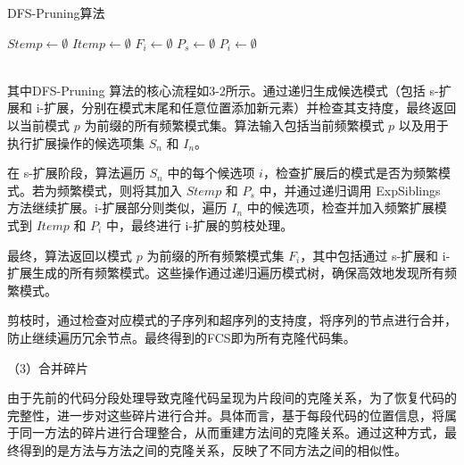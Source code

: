\begin{algorithm}[htbp]
\caption{DFS-Pruning算法}

$Stemp \gets \emptyset$ 
$Itemp \gets \emptyset$ 
$F_i \gets \emptyset$ 
$P_s \gets \emptyset$ 
$P_i \gets \emptyset$ \\
 \\
\end{algorithm}
    

其中DFS-Pruning 算法的核心流程如3-2所示。通过递归生成候选模式（包括 s-扩展和 i-扩展，分别在模式末尾和任意位置添加新元素）并检查其支持度，最终返回以当前模式 $p$ 为前缀的所有频繁模式集。算法输入包括当前频繁模式 $p$ 以及用于执行扩展操作的候选项集 $S_n$ 和 $I_n$。

在 s-扩展阶段，算法遍历 $S_n$ 中的每个候选项 $i$，检查扩展后的模式是否为频繁模式。若为频繁模式，则将其加入 $Stemp$ 和 $P_s$ 中，并通过递归调用 ExpSiblings 方法继续扩展。i-扩展部分则类似，遍历 $I_n$ 中的候选项，检查并加入频繁扩展模式到 $Itemp$ 和 $P_i$ 中，最终进行 i-扩展的剪枝处理。

最终，算法返回以模式 $p$ 为前缀的所有频繁模式集 $F_i$，其中包括通过 s-扩展和 i-扩展生成的所有频繁模式。这些操作通过递归遍历模式树，确保高效地发现所有频繁模式。


剪枝时，通过检查对应模式的子序列和超序列的支持度，将序列的节点进行合并，防止继续遍历冗余节点。最终得到的FCS即为所有克隆代码集。

（3）合并碎片

由于先前的代码分段处理导致克隆代码呈现为片段间的克隆关系，为了恢复代码的完整性，进一步对这些碎片进行合并。具体而言，基于每段代码的位置信息，将属于同一方法的碎片进行合理整合，从而重建方法间的克隆关系。通过这种方式，最终得到的是方法与方法之间的克隆关系，反映了不同方法之间的相似性。

